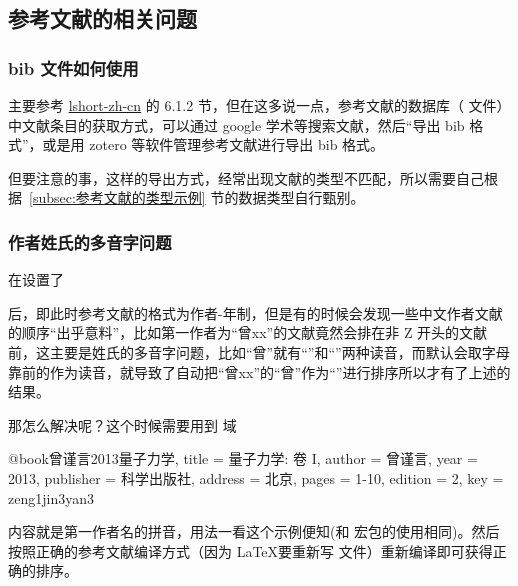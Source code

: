 
\subsection{参考文献的相关问题}

\subsubsection{ bib 文件如何使用}

主要参考 \href{https://ctan.math.illinois.edu/info/lshort/chinese/lshort-zh-cn.pdf}{lshort-zh-cn} 的 6.1.2 节，但在这多说一点，参考文献的数据库（ 文件）中文献条目的获取方式，可以通过 google 学术等搜索文献，然后“导出 bib 格式”，或是用 zotero 等软件管理参考文献进行导出 bib 格式。

但要注意的事，这样的导出方式，经常出现文献的类型不匹配，所以需要自己根据~\ref{subsec:参考文献的类型示例} 节的数据类型自行甄别。


\subsubsection{作者姓氏的多音字问题}

在设置了
\begin{latexexample}
\end{latexexample}
后，即此时参考文献的格式为作者-年制，但是有的时候会发现一些中文作者文献的顺序“出乎意料”，比如第一作者为“曾xx”的文献竟然会排在非 Z 开头的文献前，这主要是姓氏的多音字问题，比如“曾”就有“”和“”两种读音，而默认会取字母靠前的作为读音，就导致了自动把“曾xx”的“曾”作为“”进行排序所以才有了上述的结果。

那怎么解决呢？这个时候需要用到  域

\begin{latexexample}[emph={key}]
  @book{曾谨言2013量子力学,
    title     = {量子力学: 卷 I},
    author    = {曾谨言},
    year      = {2013},
    publisher = {科学出版社},
    address   = {北京},
    pages     = {1-10},
    edition   = {2},
    key       = {zeng1jin3yan3}
  }
\end{latexexample}

内容就是第一作者名的拼音，用法一看这个示例便知(和  宏包的使用相同)。然后按照正确的参考文献编译方式（因为 \LaTeX 要重新写  文件）重新编译即可获得正确的排序。